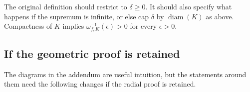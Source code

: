 \begin{remark}
The original definition should restrict to $\delta\geq0$.  It should also specify what happens if the supremum is infinite, or else cap $\delta$ by $\operatorname{diam}(K)$ as above.  Compactness of $K$ implies $\omega_{f,K}^{-1}(\epsilon)>0$ for every $\epsilon>0$.
\end{remark}

\subsection{If the geometric proof is retained}

The diagrams in the addendum are useful intuition, but the statements around them need the following changes if the radial proof is retained.

